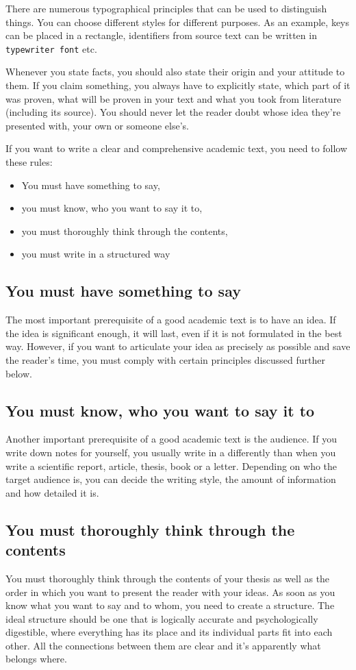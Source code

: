 There are numerous typographical principles that can be used to distinguish things. You can choose different styles for different purposes. As an example, keys can be placed in a rectangle, identifiers from source text can be written in {\tt typewriter font} etc.

Whenever you state facts, you should also state their origin and your attitude to them. If you claim something, you always have to explicitly state, which part of it was proven, what will be proven in your text and what you took from literature (including its source). You should never let the reader doubt whose idea they're presented with, your own or someone else's.


If you want to write a clear and comprehensive academic text, you need to follow these rules:
\begin{itemize}
\item You must have something to say,
\item you must know, who you want to say it to,
\item you must thoroughly think through the contents,
\item you must write in a structured way 
\end{itemize}

\subsection*{You must have something to say}
The most important prerequisite of a good academic text is to have an idea. If the idea is significant enough, it will last, even if it is not formulated in the best way. However, if you want to articulate your idea as precisely as possible and save the reader's time, you must comply with certain principles discussed further below.

\subsection*{You must know, who you want to say it to}
Another important prerequisite of a good academic text is the audience. If you write down notes for yourself, you usually write in a differently than when you write a scientific report, article, thesis, book or a letter. Depending on who the target audience is, you can decide the writing style, the amount of information and how detailed it is. 

\subsection*{You must thoroughly think through the contents}
You must thoroughly think through the contents of your thesis as well as the order in which you want to present the reader with your ideas. As soon as you know what you want to say and to whom, you need to create a structure. The ideal structure should be one that is logically accurate and psychologically digestible, where everything has its place and its individual parts fit into each other. All the connections between them are clear and it's apparently what belongs where.

